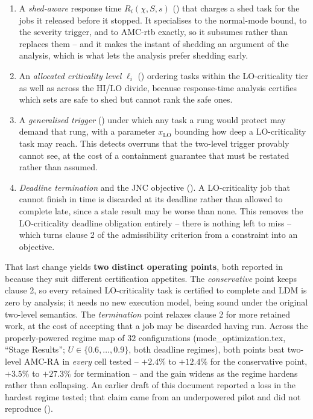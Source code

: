 \documentclass{article}
\begin{document}
\begin{enumerate}
\item A \emph{shed-aware} response time $R_i(\chi, S, s)$
  () that charges a shed task for the jobs it released
  before it stopped. It specialises to the normal-mode bound, to the severity
  trigger, and to AMC-rtb exactly, so it subsumes rather than replaces them --
  and it makes the instant of shedding an argument of the analysis, which is
  what lets the analysis prefer shedding early.
\item An \emph{allocated criticality level} $\ell_i$
  () ordering tasks within the LO-criticality tier
  as well as across the HI/LO divide, because response-time analysis certifies
  which sets are safe to shed but cannot rank the safe ones.
\item A \emph{generalised trigger} () under which any task
  a rung would protect may demand that rung, with a parameter
  $x_{\mathrm{LO}}$ bounding how deep a LO-criticality task may reach. This
  detects overruns that the two-level trigger provably cannot see, at the cost
  of a containment guarantee that must be restated rather than assumed.
\item \emph{Deadline termination} and the JNC objective
  (). A LO-criticality job that cannot
  finish in time is discarded at its deadline rather than allowed to complete
  late, since a stale result may be worse than none. This removes the
  LO-criticality deadline obligation entirely -- there is nothing left to miss
  -- which turns clause 2 of the admissibility criterion from a constraint into
  an objective.
\end{enumerate}

That last change yields \textbf{two distinct operating points}, both reported
in  because they suit different certification
appetites. The \emph{conservative} point keeps clause 2, so every retained
LO-criticality task is certified to complete and LDM is zero by analysis; it
needs no new execution model, being sound under the original two-level
semantics. The \emph{termination} point relaxes clause 2 for more retained
work, at the cost of accepting that a job may be discarded having run. Across
the properly-powered regime map of $32$ configurations
(mode\_optimization.tex, ``Stage Results''; $U \in \{0.6,\ldots,0.9\}$, both
deadline regimes), both points beat two-level AMC-RA in \emph{every} cell
tested -- $+2.4\%$ to $+12.4\%$ for the conservative point, $+3.5\%$ to
$+27.3\%$ for termination -- and the gain widens as the regime hardens rather
than collapsing. An earlier draft of this document reported a loss in the
hardest regime tested; that claim came from an underpowered pilot and did not
reproduce ().
\end{document}
